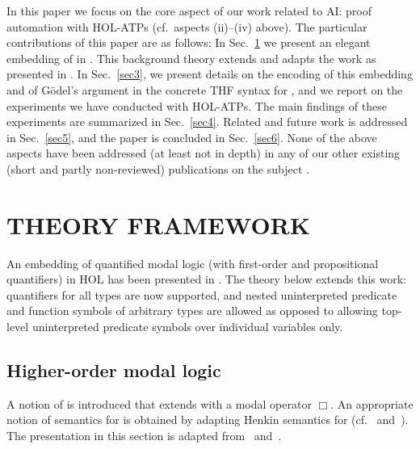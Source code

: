 \documentclass{ecai2014}
\newcommand\entity[1]{\text{\textrm{#1}}}
\def\HOML{\entity{HOML}\xspace}
\def\HOL{\entity{HOL}\xspace}
\begin{document}
In this paper we focus on the core aspect of our work related to AI: proof automation with HOL-ATPs (cf.~aspects (ii)--(iv)
above). %
The particular contributions of this paper are as follows: 
In Sec.~\ref{sec2} we present an elegant embedding of 
\HOML \cite{Gallin75,homl} in \HOL \cite{andrewsSEP,B5}. 
This background theory extends and
adapts the work as presented in \cite{B9,J23}.
In Sec.~\ref{sec3}, we present details on the
encoding of this embedding and of G{\"o}del's argument in the
concrete THF syntax \cite{J22} for \HOL, and we report on the
experiments we have conducted with HOL-ATPs.  The main findings of
these experiments are summarized in Sec.~\ref{sec4}.
Related and future work is addressed in Sec.~\ref{sec5}, and the paper
is concluded in Sec.~\ref{sec6}.
None of the above aspects have been addressed (at least
not in depth) in any of our other existing (short and partly
non-reviewed) publications on the subject \cite{J30,J28,W50,J29}.



\section{THEORY FRAMEWORK}\label{sec2}
An embedding of quantified modal logic (with first-order and
propositional quantifiers) in HOL has been presented in
\cite{J23}. The theory below extends this work: quantifiers for all
types are now supported, and nested uninterpreted predicate and
function symbols of arbitrary types
are allowed as opposed to allowing top-level uninterpreted
predicate symbols over individual variables only.

\subsection{Higher-order modal logic}
A notion of \HOML is introduced that extends \HOL with a modal
operator $\Box$. An appropriate notion of semantics for \HOML is
obtained by adapting Henkin semantics for \HOL (cf.~\cite{Henkin50}
and~\cite{Gallin75}). The presentation in this section is adapted
from~\cite{homl} and~\cite{andrewsSEP}.
\end{document}
